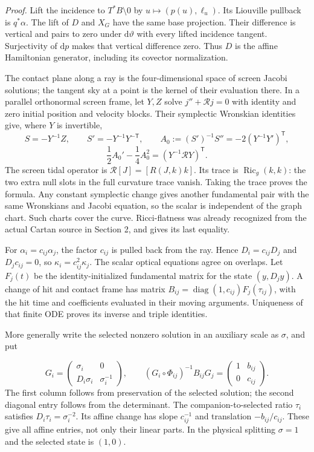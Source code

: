 \documentclass[
  english,
  11pt,
  reqno]{amsart}
\begin{document}
\emph{Proof.} Lift the incidence to \(T^*B\setminus0\) by
\(u\mapsto(p(u),\ell_u)\). Its Liouville pullback is \(q^*\alpha\). The
lift of \(D\) and \(X_G\) have the same base projection. Their
difference is vertical and pairs to zero under \(\mathrm d\vartheta\)
with every lifted incidence tangent. Surjectivity of \(\mathrm dp\)
makes that vertical difference zero. Thus \(D\) is the affine
Hamiltonian generator, including its covector normalization.

The contact plane along a ray is the four-dimensional space of screen
Jacobi solutions; the tangent sky at a point is the kernel of their
evaluation there. In a parallel orthonormal screen frame, let \(Y,Z\)
solve \(j''+\mathcal Rj=0\) with identity and zero initial position and
velocity blocks. Their symplectic Wronskian identities give, where \(Y\)
is invertible, \[
S=-Y^{-1}Z,\qquad
S'=-Y^{-1}Y^{-\mathsf T},\qquad
A_0:=(S')^{-1}S''=-2(Y^{-1}Y')^{\mathsf T},
\] \label{eq:online-optical-jacobi-calculation} \[
\frac12A_0'-\frac14A_0^2
=(Y^{-1}\mathcal RY)^{\mathsf T}.
\] The screen tidal operator is \(\mathcal R[J]=[R(J,k)k]\). Its trace
is \(\operatorname{Ric}_g(k,k)\): the two extra null slots in the full
curvature trace vanish. Taking the trace proves the formula. Any
constant symplectic change gives another fundamental pair with the same
Wronskians and Jacobi equation, so the scalar is independent of the
graph chart. Such charts cover the curve. Ricci-flatness was already
recognized from the actual Cartan source in Section 2, and gives its
last equality.

For \(\alpha_i=c_{ij}\alpha_j\), the factor \(c_{ij}\) is pulled back
from the ray. Hence \(D_i=c_{ij}D_j\) and \(D_jc_{ij}=0\), so
\(\kappa_i=c_{ij}^2\kappa_j\). The scalar optical equations agree on
overlaps. Let \(F_j(t)\) be the identity-initialized fundamental matrix
for the state \((y,D_jy)\). A change of hit and contact frame has matrix
\(B_{ij}=\operatorname{diag}(1,c_{ij})F_j(\tau_{ij})\), with the hit
time and coefficients evaluated in their moving arguments. Uniqueness of
that finite ODE proves its inverse and triple identities.

More generally write the selected nonzero solution in an auxiliary scale
as \(\sigma\), and put

\label{eq:online-optical-affine-states} \[
G_i=\begin{pmatrix}\sigma_i&0\\D_i\sigma_i&\sigma_i^{-1}\end{pmatrix},
\qquad
(G_i\circ\Phi_{ij})^{-1}B_{ij}G_j
=\begin{pmatrix}1&b_{ij}\\0&c_{ij}\end{pmatrix}.
\] The first column follows from preservation of the selected solution;
the second diagonal entry follows from the determinant. The
companion-to-selected ratio \(\tau_i\) satisfies
\(D_i\tau_i=\sigma_i^{-2}\). Its affine change has slope \(c_{ij}^{-1}\)
and translation \(-b_{ij}/c_{ij}\). These give all affine entries, not
only their linear parts. In the physical splitting \(\sigma=1\) and the
selected state is \((1,0)\).
\end{document}
